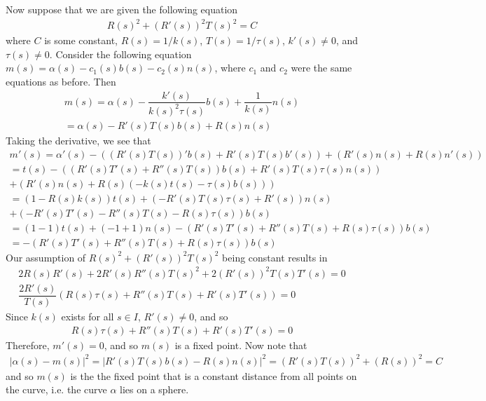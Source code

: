 \documentclass{article}
\begin{document}
	Now suppose that we are given the following equation
	\begin{gather*}
		R(s)^2 + (R'(s))^2 T(s)^2 = C
	\end{gather*}
	where $C$ is some constant, $R(s) = 1/k(s)$, $T(s) = 1/\tau(s)$, $k'(s) \neq 0$, and $\tau(s) \neq 0$. Consider the following equation $m(s) = \alpha(s) - c_1(s)b(s) - c_2(s)n(s)$, where $c_1$ and $c_2$ were the same equations as before. Then
	\begin{gather*}
		m(s) = \alpha(s) - \dfrac{k'(s)}{k(s)^2 \tau(s)} b(s) + \dfrac{1}{k(s)} n(s) \\
		= \alpha(s) - R'(s)T(s)b(s) + R(s) n(s)
	\end{gather*}
	Taking the derivative, we see that
	\begin{gather*}
		m'(s) = \alpha'(s) - \left( (R'(s)T(s))' b(s) + R'(s) T(s) b'(s) \right) + \left( R'(s) n(s) + R(s) n'(s) \right) \\
		= t(s) - \left( (R'(s)T'(s) + R''(s)T(s)) b(s) + R'(s) T(s) \tau(s) n(s) \right) \\
		+ \left( R'(s) n(s) + R(s) ( -k(s)t(s) - \tau(s) b(s) ) \right) \\
		= \left( 1 - R(s)k(s) \right) t(s)
		+ \left( -R'(s) T(s) \tau(s) + R'(s) \right) n(s) \\
		+ \left( -R'(s)T'(s) - R''(s)T(s) - R(s) \tau(s) \right) b(s) \\
		= (1 - 1)t(s) + (-1 + 1) n(s) - \left( R'(s)T'(s) + R''(s)T(s) + R(s) \tau(s) \right) b(s) \\
		= - \left( R'(s)T'(s) + R''(s)T(s) + R(s) \tau(s) \right) b(s)
	\end{gather*}
	Our assumption of $R(s)^2 + (R'(s))^2 T(s)^2$ being constant results in
	\begin{gather*}
		2 R(s) R'(s) + 2 R'(s) R''(s) T(s)^2 + 2 (R'(s))^2 T(s) T'(s) = 0 \\
		\dfrac{2 R'(s)}{ T(s) } \left( R(s)\tau(s) + R''(s)T(s) + R'(s) T'(s) \right) = 0
	\end{gather*}
	Since $k(s)$ exists for all $s \in I$, $R'(s) \neq 0$, and so
	\begin{gather*}
		 R(s)\tau(s) + R''(s)T(s) + R'(s) T'(s) = 0
	\end{gather*}
	Therefore, $m'(s) = 0$, and so $m(s)$ is a fixed point. Now note that
	\begin{gather*}
		\left| \alpha(s) - m(s) \right|^2 = \left| R'(s) T(s) b(s) - R(s) n(s) \right|^2 = \left( R'(s) T(s) \right)^2 + \left( R(s) \right)^2 = C
	\end{gather*} 
	and so $m(s)$ is the the fixed point that is a constant distance from all points on the curve, i.e. the curve $\alpha$ lies on a sphere.
	
\end{document}

